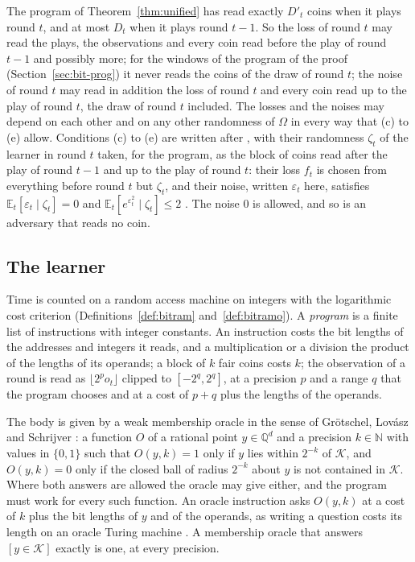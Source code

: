 \documentclass[11pt]{amsart}
\theoremstyle{definition}
\numberwithin{equation}{section}
\newcommand{\E}{\mathbb{E}}
\newcommand{\cK}{\mathcal{K}}
\begin{document}
The program of Theorem~\ref{thm:unified} has read exactly $D'_t$ coins when it plays round $t$, and at most $D_t$ when it plays round $t-1$. So the loss of round $t$ may read the plays, the observations and every coin read before the play of round $t-1$ and possibly more; for the windows of the program of the proof (Section~\ref{sec:bit-prog}) it never reads the coins of the draw of round $t$; the noise of round $t$ may read in addition the loss of round $t$ and every coin read up to the play of round $t$, the draw of round $t$ included. The losses and the noises may depend on each other and on any other randomness of $\Omega$ in every way that (c) to (e) allow. Conditions (c) to (e) are written after \cite[Section~3]{BJLR26}, with their randomness $\zeta_t$ of the learner in round $t$ taken, for the program, as the block of coins read after the play of round $t-1$ and up to the play of round $t$: their loss $f_t$ is chosen from everything before round $t$ but $\zeta_t$, and their noise, written $\varepsilon_t$ here, satisfies $\E_t[\varepsilon_t\mid\zeta_t]=0$ and $\E_t[e^{\varepsilon_t^2}\mid\zeta_t]\le2$ \cite[Section~3, (1)]{BJLR26}. The noise $0$ is allowed, and so is an adversary that reads no coin.

\subsection{The learner}\label{sec:intro-results}

Time is counted on a random access machine on integers with the logarithmic cost criterion \cite{CR73,AHU74} (Definitions~\ref{def:bitram} and~\ref{def:bitramo}). A \emph{program} is a finite list of instructions with integer constants. An instruction costs the bit lengths of the addresses and integers it reads, and a multiplication or a division the product of the lengths of its operands; a block of $k$ fair coins costs $k$; the observation of a round is read as $\lfloor2^po_t\rfloor$ clipped to $[-2^q,2^q]$, at a precision $p$ and a range $q$ that the program chooses and at a cost of $p+q$ plus the lengths of the operands.

The body is given by a weak membership oracle in the sense of Gr\"otschel, Lov\'asz and Schrijver \cite[(2.1.14)]{GLS93}: a function $O$ of a rational point $y\in\mathbb Q^d$ and a precision $k\in\mathbb N$ with values in $\{0,1\}$ such that $O(y,k)=1$ only if $y$ lies within $2^{-k}$ of $\cK$, and $O(y,k)=0$ only if the closed ball of radius $2^{-k}$ about $y$ is not contained in $\cK$. Where both answers are allowed the oracle may give either, and the program must work for every such function. An oracle instruction asks $O(y,k)$ at a cost of $k$ plus the bit lengths of $y$ and of the operands, as writing a question costs its length on an oracle Turing machine \cite[Section~1.2]{GLS93}. A membership oracle that answers $[y\in\cK]$ exactly is one, at every precision.
\end{document}
